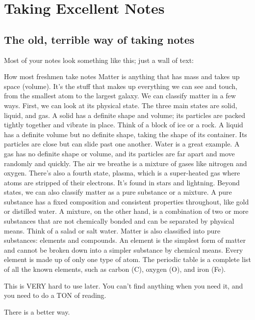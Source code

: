 \documentclass[../../Main/main.tex]{subfiles}
\begin{document}
\chapter{Taking Excellent Notes}

\section{The old, terrible way of taking notes}

Most of your notes look something like this; just a wall of text:

\begin{boxRed}{How most freshmen take notes}
	Matter is anything that has mass and takes up space (volume). It's the stuff that makes up everything we can see and touch, from the smallest atom to the largest galaxy. We can classify matter in a few ways. First, we can look at its physical state. The three main states are solid, liquid, and gas. A solid has a definite shape and volume; its particles are packed tightly together and vibrate in place. Think of a block of ice or a rock. A liquid has a definite volume but no definite shape, taking the shape of its container. Its particles are close but can slide past one another. Water is a great example. A gas has no definite shape or volume, and its particles are far apart and move randomly and quickly. The air we breathe is a mixture of gases like nitrogen and oxygen. There's also a fourth state, plasma, which is a super-heated gas where atoms are stripped of their electrons. It's found in stars and lightning. Beyond states, we can also classify matter as a pure substance or a mixture. A pure substance has a fixed composition and consistent properties throughout, like gold or distilled water. A mixture, on the other hand, is a combination of two or more substances that are not chemically bonded and can be separated by physical means. Think of a salad or salt water.  Matter is also classified into pure substances: elements and compounds. An element is the simplest form of matter and cannot be broken down into a simpler substance by chemical means. Every element is made up of only one type of atom. The periodic table is a complete list of all the known elements, such as carbon (C), oxygen (O), and iron (Fe).
\end{boxRed}

This is VERY hard to use later.  You can't find anything when you need it, and you need to do a TON of reading.

There is a better way.
\end{document}
